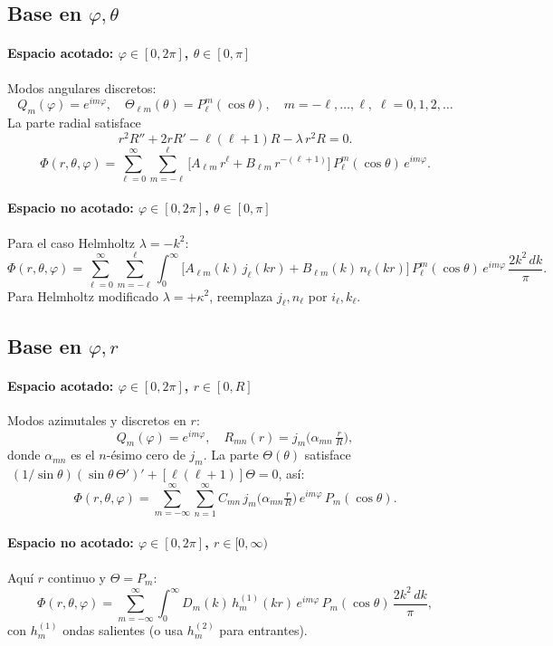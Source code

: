 \documentclass[12pt,a4paper]{article}
\begin{document}
\subsection{Base en \(\varphi,\theta\)}

\paragraph{Espacio acotado: \(\varphi\in[0,2\pi]\), \(\theta\in[0,\pi]\)}  
Modos angulares discretos:
\[
Q_m(\varphi)=e^{i m\varphi},\quad
\Theta_{\ell m}(\theta)=P_\ell^m(\cos\theta),
\quad m=-\ell,\dots,\ell,\;\ell=0,1,2,\dots
\]
La parte radial satisface
\[
r^2R''+2rR'-\ell(\ell+1)R-\lambda\,r^2R=0.
\]
\[
\boxed{
\Phi(r,\theta,\varphi)
=\sum_{\ell=0}^{\infty}\sum_{m=-\ell}^{\ell}
\bigl[A_{\ell m}\,r^{\ell}+B_{\ell m}\,r^{-(\ell+1)}\bigr]\,
P_\ell^m(\cos\theta)\,e^{i m\varphi}.
}
\]

\paragraph{Espacio no acotado: \(\varphi\in[0,2\pi]\), \(\theta\in[0,\pi]\)}  
Para el caso Helmholtz \(\lambda=-k^2\):
\[
\boxed{
\Phi(r,\theta,\varphi)
=\sum_{\ell=0}^{\infty}\sum_{m=-\ell}^{\ell}
\int_{0}^{\infty}
\bigl[A_{\ell m}(k)\,j_\ell(k r)+B_{\ell m}(k)\,n_\ell(k r)\bigr]\,
P_\ell^m(\cos\theta)\,e^{i m\varphi}\,
\frac{2k^2\,dk}{\pi}.
}
\]
Para Helmholtz modificado \(\lambda=+\kappa^2\), reemplaza \(j_\ell,n_\ell\) por \(i_\ell,k_\ell\).

\subsection{Base en \(\varphi,r\)}

\paragraph{Espacio acotado: \(\varphi\in[0,2\pi]\), \(r\in[0,R]\)}  
Modos azimutales y discretos en \(r\):
\[
Q_m(\varphi)=e^{i m\varphi},\quad
R_{m n}(r)=j_m\!\bigl(\alpha_{m n}\,\tfrac{r}{R}\bigr),
\]
donde \(\alpha_{m n}\) es el \(n\)-ésimo cero de \(j_m\).  
La parte \( \Theta(\theta)\) satisface
\(\;(1/\sin\theta)(\sin\theta\,\Theta')'+[\ell(\ell+1)]\Theta=0\), así:
\[
\boxed{
\Phi(r,\theta,\varphi)
=\sum_{m=-\infty}^{\infty}\sum_{n=1}^{\infty}
C_{m n}\,
j_m\!\bigl(\alpha_{m n}\tfrac{r}{R}\bigr)\,
e^{i m\varphi}\,
P_m(\cos\theta).
}
\]

\paragraph{Espacio no acotado: \(\varphi\in[0,2\pi]\), \(r\in[0,\infty)\)}  
Aquí \(r\) continuo y \(\Theta=P_m\):
\[
\boxed{
\Phi(r,\theta,\varphi)
=\sum_{m=-\infty}^{\infty}
\int_{0}^{\infty}
D_{m}(k)\,
h_m^{(1)}(k r)\,
e^{i m\varphi}\,
P_m(\cos\theta)\,
\frac{2k^2\,dk}{\pi},
}
\]
con \(h_m^{(1)}\) ondas salientes (o usa \(h_m^{(2)}\) para entrantes).
\end{document}
